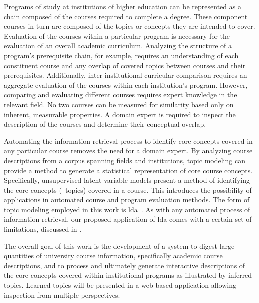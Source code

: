 
Programs of study at institutions of higher education can be represented as a chain composed of the courses required to complete a degree.
These component courses in turn are composed of the topics or concepts they are intended to cover.
Evaluation of the courses within a particular program is necessary for the evaluation of an overall academic curriculum.
Analyzing the structure of a program's prerequisite chain, for example, requires an understanding of each constituent course and any overlap of covered topics between courses and their prerequisites.
Additionally, inter-institutional curricular comparison requires an aggregate evaluation of the courses within each institution's program.
However, comparing and evaluating different courses requires expert knowledge in the relevant field.
No two courses can be measured for similarity based only on inherent, measurable properties.
A domain expert is required to inspect the description of the courses and determine their conceptual overlap.


Automating the information retrieval process to identify core concepts covered in any particular course removes the need for a domain expert.
By analyzing course descriptions from a corpus spanning fields and institutions, topic modeling can provide a method to generate a statistical representation of core course concepts.
Specifically, unsupervised latent variable models present a method of identifying the core concepts (\ie\ topics) covered in a course.
This introduces the possibility of applications in automated course and program evaluation methods.
The form of topic modeling employed in this work is \acf{lda}~\cite{Blei2003}.
As with any automated process of information retrieval, our proposed application of \ac{lda} comes with a certain set of limitations, discussed in .


The overall goal of this work is the development of a system to digest large quantities of university course information, specifically academic course descriptions, and to process and ultimately generate interactive descriptions of the core concepts covered within institutional programs as illustrated by inferred topics.
Learned topics will be presented in a web-based application allowing inspection from multiple perspectives.


